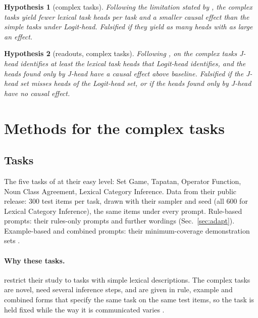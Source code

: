\documentclass[11pt,a4paper]{article}
\newtheorem{hypothesis}{Hypothesis}
\begin{document}
\begin{hypothesis}[complex tasks]\label{h:complex}
Following the limitation stated by \citet[Sec.~4]{yang2026shared}, the complex tasks yield fewer lexical task heads per task and a smaller causal effect than the simple tasks under Logit-head. \emph{Falsified} if they yield as many heads with as large an effect.
\end{hypothesis}

\begin{hypothesis}[readouts, complex tasks]\label{h:readout-complex}
Following \citet{merlo2026headjlens}, on the complex tasks J-head identifies at least the lexical task heads that Logit-head identifies, and the heads found only by J-head have a causal effect above baseline. \emph{Falsified} if the J-head set misses heads of the Logit-head set, or if the heads found only by J-head have no causal effect.
\end{hypothesis}

\section{Methods for the complex tasks}\label{sec:methods-complex}

\subsection{Tasks}\label{sec:tasks-complex}
The five tasks of \citet{fu2026rules} at their easy level: Set Game, Tapatan, Operator Function, Noun Class Agreement, Lexical Category Inference. Data from their public release: 300 test items per task, drawn with their sampler and seed (all 600 for Lexical Category Inference), the same items under every prompt.
Rule-based prompts: their rules-only prompts \citep[App.~F]{fu2026rules} and further wordings (Sec.~\ref{sec:adapt}).
Example-based and combined prompts: their minimum-coverage demonstration sets \citep[Sec.~2.5]{fu2026rules}.

\paragraph{Why these tasks.} \citet[Sec.~4]{yang2026shared} restrict their study to tasks with simple lexical descriptions. The complex tasks are novel, need several inference steps, and are given in rule, example and combined forms that specify the same task on the same test items, so the task is held fixed while the way it is communicated varies \citep[Sec.~1--2]{fu2026rules}.
\end{document}
